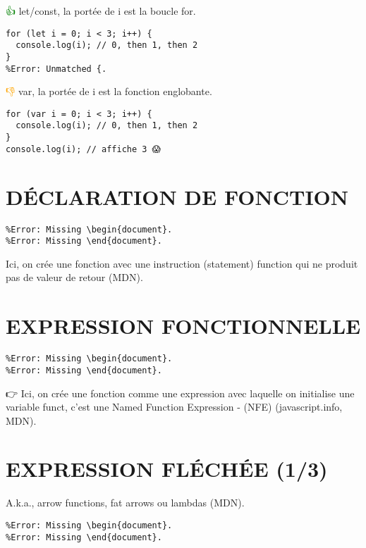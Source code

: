 \documentclass{article}
\begin{document}
\textcolor{green}{👍} let/const, la portée de i est la boucle for.

\begin{verbatim}
for (let i = 0; i < 3; i++) {
  console.log(i); // 0, then 1, then 2
}
%Error: Unmatched {.
\end{verbatim}

\textcolor{orange}{👎} var, la portée de i est la fonction englobante.

\begin{verbatim}
for (var i = 0; i < 3; i++) {
  console.log(i); // 0, then 1, then 2
}
console.log(i); // affiche 3 😱
\end{verbatim}

\section{DÉCLARATION DE FONCTION}
\begin{verbatim}
%Error: Missing \begin{document}.
%Error: Missing \end{document}.
\end{verbatim}

Ici, on crée une fonction avec une instruction (statement) function qui ne produit pas de valeur de retour (MDN).

\section{EXPRESSION FONCTIONNELLE}
\begin{verbatim}
%Error: Missing \begin{document}.
%Error: Missing \end{document}.
\end{verbatim}

👉 Ici, on crée une fonction comme une expression avec laquelle on initialise une variable funct, c’est une Named Function Expression - (NFE) (javascript.info, MDN).

\section{EXPRESSION FLÉCHÉE (1/3)}
A.k.a., arrow functions, fat arrows ou lambdas (MDN).

\begin{verbatim}
%Error: Missing \begin{document}.
%Error: Missing \end{document}.
\end{verbatim}
\end{document}
